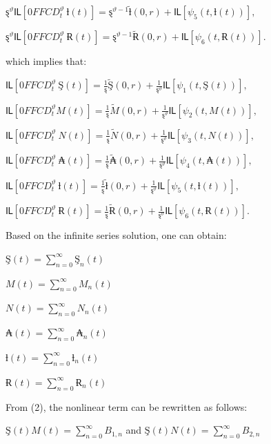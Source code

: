 \documentclass[10pt]{NSP1}
\begin{document}
\(ȿ^{\vartheta}Ỻ\left\lbrack 0FFCD_{t}^{\vartheta}\ ƚ(t) \right\rbrack = ȿ^{\vartheta - 1}\widetilde{ƚ}(0,r) + Ỻ\left\lbrack \psi_{5}\left( t,ƚ(t) \right) \right\rbrack,\)

\(ȿ^{\vartheta}Ỻ\left\lbrack 0FFCD_{t}^{\vartheta}\ Ɍ(t) \right\rbrack = ȿ^{\vartheta - 1}\widetilde{Ɍ}(0,r) + Ỻ\left\lbrack \psi_{6}\left( t,Ɍ(t) \right) \right\rbrack\).

which implies that:

\(Ỻ\left\lbrack 0FFCD_{t}^{\vartheta}\ Ş(t) \right\rbrack = \frac{1}{ȿ}\widetilde{Ş}(0,r) + \frac{1}{ȿ^{\vartheta}}Ỻ\left\lbrack \psi_{1}\left( t,Ş(t) \right) \right\rbrack,\)

\(Ỻ\left\lbrack 0FFCD_{t}^{\vartheta}M(t) \right\rbrack = \frac{1}{ȿ}\widetilde{M}(0,r) + \frac{1}{ȿ^{\vartheta}}Ỻ\left\lbrack \psi_{2}\left( t,M(t) \right) \right\rbrack,\)

\(Ỻ\left\lbrack 0FFCD_{t}^{\vartheta}\ N(t) \right\rbrack = \frac{1}{ȿ}\widetilde{N}(0,r) + \frac{1}{ȿ^{\vartheta}}Ỻ\left\lbrack \psi_{3}\left( t,N(t) \right) \right\rbrack,\)

\(Ỻ\left\lbrack 0FFCD_{t}^{\vartheta}\ ₳(t) \right\rbrack = \frac{1}{ȿ}\widetilde{₳}(0,r) + \frac{1}{ȿ^{\vartheta}}Ỻ\left\lbrack \psi_{4}\left( t,₳(t) \right) \right\rbrack,\)

\(Ỻ\left\lbrack 0FFCD_{t}^{\vartheta}\ ƚ(t) \right\rbrack = \frac{1}{ȿ}\widetilde{ƚ}(0,r) + \frac{1}{ȿ^{\vartheta}}Ỻ\left\lbrack \psi_{5}\left( t,ƚ(t) \right) \right\rbrack,\)

\(Ỻ\left\lbrack 0FFCD_{t}^{\vartheta}\ Ɍ(t) \right\rbrack = \frac{1}{ȿ}\widetilde{Ɍ}(0,r) + \frac{1}{ȿ^{\vartheta}}Ỻ\left\lbrack \psi_{6}\left( t,Ɍ(t) \right) \right\rbrack.\)

Based on the infinite series solution, one can obtain:

\(Ş(t) = \sum_{n = 0}^{\infty}{}Ş_{n}(t)\)

\(M(t) = \sum_{n = 0}^{\infty}{}M_{n}(t)\)

\(N(t) = \sum_{n = 0}^{\infty}{}N_{n}(t)\)

\(₳(t) = \sum_{n = 0}^{\infty}{}₳_{n}(t)\)

\(ƚ(t) = \sum_{n = 0}^{\infty}{}ƚ_{n}(t)\)

\(Ɍ(t) = \sum_{n = 0}^{\infty}{}Ɍ_{n}(t)\)

From (2), the nonlinear term can be rewritten as follows:

\(Ş(t)M(t) = \sum_{n = 0}^{\infty}{}B_{1,n}\) and \(Ş(t)N(t) = \sum_{n = 0}^{\infty}{}B_{2,n}\)
\end{document}
